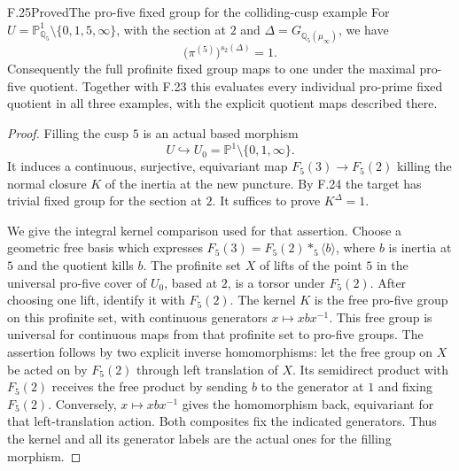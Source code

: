 \begin{statement}{F.25}{Proved}{The pro-five fixed group for the colliding-cusp example}
For $U=\mathbb P^1_{\mathbb Q_5}\setminus\{0,1,5,\infty\}$,
with the section at $2$ and
$\Delta=G_{\mathbb Q_5(\mu_\infty)}$, we have
\[
       \bigl(\pi^{(5)}\bigr)^{s_2(\Delta)}=1.                \tag{F.25.1}
\]
Consequently the full profinite fixed group maps to one
under the maximal pro-five quotient.  Together with
F.23 this evaluates every individual pro-prime fixed
quotient in all three examples, with the explicit
quotient maps described there.
\end{statement}
\begin{proof}
Filling the cusp $5$ is an actual based morphism
\[
 U\hookrightarrow U_0=\mathbb P^1\setminus\{0,1,\infty\}.
\]
It induces a continuous, surjective, equivariant map
$F_5(3)\to F_5(2)$ killing the normal closure $K$ of
the inertia at the new puncture.  By F.24 the target
has trivial fixed group for the section at $2$.
It suffices to prove $K^\Delta=1$.

We give the integral kernel comparison used for that
assertion.  Choose a geometric free basis which
expresses $F_5(3)=F_5(2)*_5\langle b\rangle$, where
$b$ is inertia at $5$ and the quotient kills $b$.
The profinite set $X$ of lifts of the point $5$ in
the universal pro-five cover of $U_0$, based at $2$,
is a torsor under $F_5(2)$.
After choosing one lift, identify it with $F_5(2)$.
The kernel $K$ is the free pro-five group on this
profinite set, with continuous generators
$x\mapsto xbx^{-1}$.
This free group is universal for continuous maps
from that profinite set to pro-five groups.
The assertion follows by two explicit inverse
homomorphisms: let the free group on $X$ be acted on
by $F_5(2)$ through left translation of $X$.
Its semidirect product with $F_5(2)$ receives the
free product by sending $b$ to the generator at
$1$ and fixing $F_5(2)$.
Conversely, $x\mapsto xbx^{-1}$ gives the homomorphism
back, equivariant for that left-translation action.
Both composites fix the indicated generators.
Thus the kernel and all its generator labels are
the actual ones for the filling morphism.


\end{proof}
